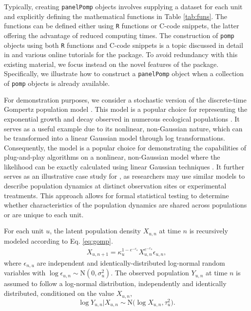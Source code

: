 Typically, creating \texttt{panelPomp} objects involves supplying a dataset for each unit and explicitly defining the mathematical functions in Table \ref{tab:funs}.
The functions can be defined either using \texttt{R} functions or C-code snippets, the latter offering the advantage of reduced computing times.
The construction of \texttt{pomp} objects using both \texttt{R} functions and C-code snippets is a topic discussed in detail in \citet{king16} and various online tutorials for the  package.
To avoid redundancy with this existing material, we focus instead on the novel features of the  package.
Specifically, we illustrate how to construct a \texttt{panelPomp} object when a collection of \texttt{pomp} objects is already available.

For demonstration purposes, we consider a stochastic version of the discrete-time Gompertz population model \citep{winsor32}.
This model is a popular choice for representing the exponential growth and decay observed in numerous ecological populations \citep{auger21, smith23, linden09}.
It serves as a useful example due to its nonlinear, non-Gaussian nature, which can be transformed into a linear Gaussian model through log transformations.
Consequently, the model is a popular choice for demonstrating the capabilities of plug-and-play algorithms on a nonlinear, non-Gaussian model where the likelihood can be exactly calculated using linear Gaussian techniques \citep{breto20}.
It further serves as an illustrative case study for , as researchers may use similar models to describe population dynamics at distinct observation sites or experimental treatments.
This approach allows for formal statistical testing to determine whether characteristics of the population dynamics are shared across populations or are unique to each unit.

For each unit \(u\), the latent population density \(X_{u,n}\) at time \(n\) is recursively modeled according to Eq. \eqref{eq:gomp}.
\begin{eqnarray}
X_{u, n+1} = \kappa_u^{1-e^{-r_u}}X^{e^{-r_u}}_{u, n}\epsilon_{u, n}, \label{eq:gomp}
\end{eqnarray}
where \(\epsilon_{n, u}\) are independent and identically-distributed log-normal random variables with \(\log \epsilon_{u, n}\sim \text{N}(0, \sigma^2_{u})\).
The observed population \(Y_{u, n}\) at time \(n\) is assumed to follow a log-normal distribution, independently and identically distributed, conditioned on the value \(X_{u, n}\),
\[
\log Y_{u, n} | X_{u, n} \sim \text{N}\big(\log X_{u, n}, \tau_u^2\big). \label{eq:gompMeas}
\]

